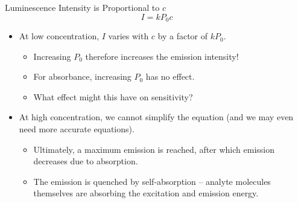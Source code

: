 \documentclass[notes=show]{beamer}
\begin{document}
\begin{frame}{Luminescence Intensity is Proportional to $c$}
	\begin{equation*}
		I = kP_0c
	\end{equation*}

	\begin{itemize}
		\item At \alert{low concentration}, $I$ varies with $c$ by a
			factor of $kP_0$.
			\begin{itemize}
				\item Increasing $P_0$ therefore increases the
					emission intensity!
				\item For absorbance, increasing $P_0$
					has no effect.
				\item What effect might this have on
					\alert{sensitivity}?
			\end{itemize}
		\item At \alert{high concentration}, we cannot simplify the
			equation (and we may even need more accurate equations).
			\begin{itemize}
				\item Ultimately, a maximum emission is reached,
					after which emission decreases due to
					absorption.
				\item The emission is \alert{quenched} by
					\alert{self-absorption} -- analyte
					molecules themselves are absorbing the
					excitation and emission energy.
			\end{itemize}
	\end{itemize}
\end{frame}

\end{document}
